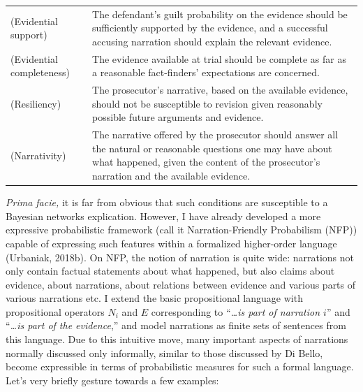 \documentclass[11pt,dvipsnames,enabledeprecatedfontcommands]{scrartcl}
\begin{document}
\vspace{2mm}

\begin{center}
\begin{tabular}{@{}lp{11.5cm}@{}}
\toprule
 (Evidential support) &The defendant's guilt probability on the evidence should be sufficiently supported by the evidence, and a successful accusing narration should explain the relevant evidence. \\
(Evidential completeness) &  The evidence available at trial should be complete as far as a reasonable fact-finders' expectations are concerned. \\
(Resiliency)&  The prosecutor's narrative, based on the available evidence, should not be susceptible to revision given reasonably possible future arguments and evidence. \\
(Narrativity) & The narrative offered by the prosecutor should answer all 
the natural or reasonable questions one may have about what happened, given the content of the prosecutor's narration and the available evidence. \\
\bottomrule
\end{tabular}
\end{center}

\vspace{2mm}

\emph{Prima facie,} it is far from obvious that such conditions are
susceptible to a Bayesian networks explication. However, I have already
developed a more expressive probabilistic framework (call it
Narration-Friendly Probabilism (NFP)) capable of expressing such
features within a formalized higher-order language (Urbaniak, 2018b). On
NFP, the notion of narration is quite wide: narrations not only contain
factual statements about what happened, but also claims about evidence,
about narrations, about relations between evidence and various parts of
various narrations etc. I extend the basic propositional language with
propositional operators \(N_i\) and \(E\) corresponding to
``\emph{\dots is part of narration $i$}'' and
``\emph{\dots is part of the evidence},'' and model narrations as finite
sets of sentences from this language. Due to this intuitive move, many
important aspects of narrations normally discussed only informally,
similar to those discussed by Di Bello, become expressible in terms of
probabilistic measures for such a formal language. Let's very briefly
gesture towards a few examples:
\end{document}
